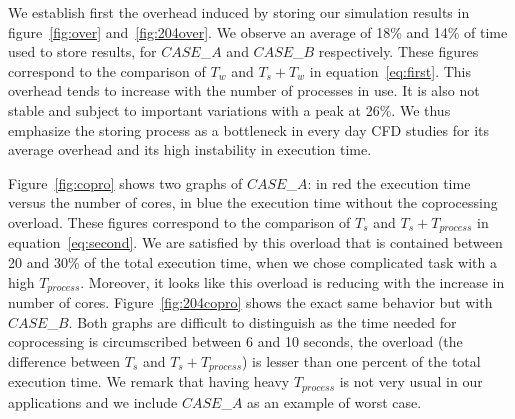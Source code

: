 We establish first the overhead induced by storing our simulation results in
figure~\ref{fig:over} and~\ref{fig:204over}. We observe an average of 18\% and
14\% of time used to store results, for $CASE$\_$A$ and $CASE$\_$B$
respectively. These figures correspond to the comparison of $T_w$ and $T_s +
T_w$ in equation~\ref{eq:first}. 
This overhead tends to increase with the number of processes in
use. It is also not stable and subject to important variations with a peak at
26\%. We thus emphasize the storing process as a bottleneck in every day CFD
studies for its average overhead and its high instability in execution time.

Figure~\ref{fig:copro} shows two graphs of $CASE$\_$A$: in red the execution 
time versus the number of cores, in blue the execution time without
the coprocessing overload. These figures correspond to the comparison of $T_s$
and $T_s + T_{process}$ in equation~\ref{eq:second}.
We are satisfied by this overload that is contained between 20 and 30\% of the total execution time, 
when we chose complicated task with a high $T_{process}$.
Moreover, it looks like this overload is reducing with the increase in number of cores. 
Figure~\ref{fig:204copro} shows the exact same behavior but with $CASE$\_$B$. Both
graphs are difficult to distinguish as the time needed for coprocessing is
circumscribed between 6 and 10 seconds, the overload (the difference between $T_s$ and $T_s + T_{process}$) is lesser than one
percent of the total execution time. We remark that having heavy $T_{process}$ is not very usual in our applications and 
we include $CASE$\_$A$ as an example of worst case.

